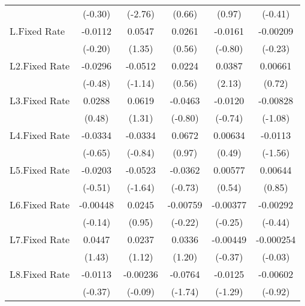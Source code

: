 {\begin{longtable}{l*{5}{c}}
                &  (-0.30)         &  (-2.76)         &   (0.66)         &   (0.97)         &  (-0.41)         \\
[1em]
L.Fixed Rate    &  -0.0112         &   0.0547         &   0.0261         &  -0.0161         & -0.00209         \\
                &  (-0.20)         &   (1.35)         &   (0.56)         &  (-0.80)         &  (-0.23)         \\
[1em]
L2.Fixed Rate   &  -0.0296         &  -0.0512         &   0.0224         &   0.0387\sym{*}  &  0.00661         \\
                &  (-0.48)         &  (-1.14)         &   (0.56)         &   (2.13)         &   (0.72)         \\
[1em]
L3.Fixed Rate   &   0.0288         &   0.0619         &  -0.0463         &  -0.0120         & -0.00828         \\
                &   (0.48)         &   (1.31)         &  (-0.80)         &  (-0.74)         &  (-1.08)         \\
[1em]
L4.Fixed Rate   &  -0.0334         &  -0.0334         &   0.0672         &  0.00634         &  -0.0113         \\
                &  (-0.65)         &  (-0.84)         &   (0.97)         &   (0.49)         &  (-1.56)         \\
[1em]
L5.Fixed Rate   &  -0.0203         &  -0.0523         &  -0.0362         &  0.00577         &  0.00644         \\
                &  (-0.51)         &  (-1.64)         &  (-0.73)         &   (0.54)         &   (0.85)         \\
[1em]
L6.Fixed Rate   & -0.00448         &   0.0245         & -0.00759         & -0.00377         & -0.00292         \\
                &  (-0.14)         &   (0.95)         &  (-0.22)         &  (-0.25)         &  (-0.44)         \\
[1em]
L7.Fixed Rate   &   0.0447         &   0.0237         &   0.0336         & -0.00449         &-0.000254         \\
                &   (1.43)         &   (1.12)         &   (1.20)         &  (-0.37)         &  (-0.03)         \\
[1em]
L8.Fixed Rate   &  -0.0113         & -0.00236         &  -0.0764         &  -0.0125         & -0.00602         \\
                &  (-0.37)         &  (-0.09)         &  (-1.74)         &  (-1.29)         &  (-0.92)         \\

\end{longtable}}
